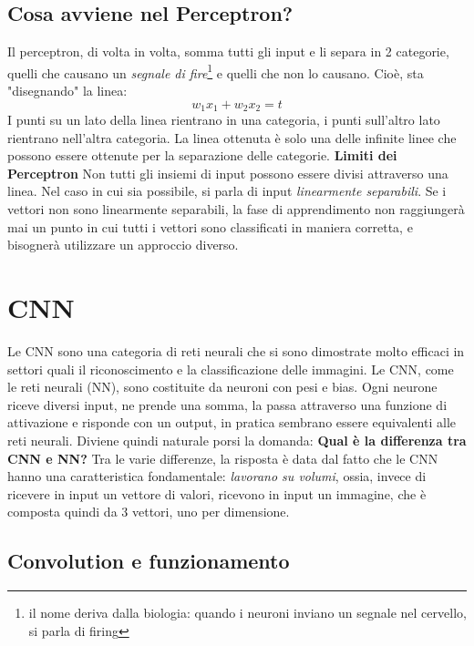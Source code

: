\subsection{Cosa avviene nel Perceptron?}
Il perceptron, di volta in volta, somma tutti gli input e li separa in 2 categorie, quelli che causano un \emph{segnale di fire}\footnote{il nome deriva dalla biologia: quando i neuroni inviano un segnale nel cervello, si parla di firing} e quelli che non lo causano. Cioè, sta "disegnando" la linea:
$$w_1x_1 + w_2x_2 = t$$
I punti su un lato della linea rientrano in una categoria, i punti sull'altro lato rientrano nell'altra categoria.
La linea ottenuta è solo una delle infinite linee che possono essere ottenute per la separazione delle categorie.
\newline
\textbf{Limiti dei Perceptron}\newline
Non tutti gli insiemi di input possono essere divisi attraverso una linea. Nel caso in cui sia possibile, si parla di input \textit{linearmente separabili}. Se i vettori non sono linearmente separabili, la fase di apprendimento non raggiungerà mai un punto in cui tutti i vettori sono classificati in maniera corretta, e bisognerà utilizzare un approccio diverso.
\cite{MediumNN}
\newpage

\section{\acf{CNN}}
\vspace{8mm}
Le \acf{CNN} sono una categoria di reti neurali che si sono dimostrate molto efficaci in settori quali il riconoscimento e la classificazione delle immagini.
Le CNN, come le reti neurali (NN), sono costituite da neuroni con pesi e bias. Ogni neurone riceve diversi input, ne prende una somma, la passa attraverso una funzione di attivazione e risponde con un output, in pratica sembrano essere equivalenti alle reti neurali.
Diviene quindi naturale porsi la domanda: \textbf{Qual è la differenza tra CNN e NN?}\newline
Tra le varie differenze, la risposta è data dal fatto che le CNN hanno una caratteristica fondamentale: \textit{lavorano su volumi}, ossia, invece di ricevere in input un vettore di valori, ricevono in input un immagine, che è composta quindi da 3 vettori, uno per dimensione.

\newpage
\subsection{Convolution e funzionamento}


